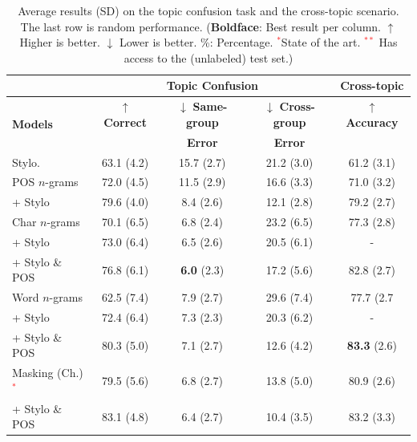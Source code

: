 \documentclass[11pt]{article}
\begin{document}
\begin{table}[!htb]
\centering
\caption{\label{tbl:topicConf} Average results (SD) on the topic confusion task and the cross-topic scenario. The last row is random performance. (\textbf{Boldface}: Best result per column. $\uparrow$ Higher is better. $\downarrow$ Lower is better. \%: Percentage. \textcolor{red}{$^{*}$}State of the art. \textcolor{red}{$^{**}$} Has access to the (unlabeled) test set.)
}
\begin{tabular}{l|ccc|||c}
\hline
& \multicolumn{3}{c|||}{\textbf{Topic Confusion}}& \textbf{Cross-topic}    \\\hline
\multirow{2}{*}{\textbf{Models}}  & $\uparrow$ \textbf{Correct} & $\downarrow$ \textbf{Same-group} & $\downarrow$ \textbf{Cross-group} & \textbf{$\uparrow$ Accuracy} \\
 &  & \textbf{Error} & \textbf{Error} &   \\\hline\hline 

Stylo.                      & 63.1 (4.2)  & 15.7 (2.7)  & 21.2 (3.0)  &  61.2 (3.1) \\\hline
POS $n$-grams               & 72.0 (4.5)  & 11.5 (2.9)  & 16.6 (3.3)  &  71.0 (3.2) \\
\phantom{hi} + Stylo        & 79.6 (4.0)  & \phantom{0}8.4 (2.6)  & 12.1 (2.8)  &  79.2 (2.7) \\\hline

Char $n$-grams              & 70.1 (6.5)  & \phantom{0}6.8 (2.4)  & 23.2 (6.5)  &  77.3 (2.8) \\			
\phantom{hi}+ Stylo         & 73.0 (6.4)  & \phantom{0}6.5 (2.6)  & 20.5 (6.1)  &  - \\
\phantom{hi}+ Stylo \& POS  & 76.8 (6.1)  & \phantom{0}\textbf{6.0} (2.3)  & 17.2 (5.6)  &  82.8 (2.7)\\\hline

Word $n$-grams              & 62.5 (7.4)  & \phantom{0}7.9 (2.7)  & 29.6 (7.4)  &  77.7 (2.7\\
\phantom{hi}+ Stylo         & 72.4 (6.4)  & \phantom{0}7.3 (2.3)  & 20.3 (6.2)  &  - \\
\phantom{hi}+ Stylo \& POS  & 80.3 (5.0)  & \phantom{0}7.1 (2.7)  & 12.6 (4.2)  &  \textbf{83.3} (2.6)\\\hline

Masking (Ch.) \textcolor{red}{$^{*}$}               & 79.5 (5.6)  & \phantom{0}6.8 (2.7)  & 13.8 (5.0)  & 80.9 (2.6) \\
\phantom{hi}+ Stylo \& POS  & 83.1 (4.8)  & \phantom{0}6.4 (2.7)  & 10.4 (3.5)  & 83.2 (3.3)\\\hline


\end{tabular}
\end{table}
\end{document}

